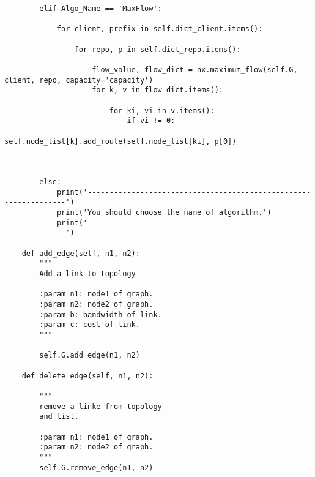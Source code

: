 \begin{lstlisting}
        elif Algo_Name == 'MaxFlow':

            for client, prefix in self.dict_client.items():

                for repo, p in self.dict_repo.items():

                    flow_value, flow_dict = nx.maximum_flow(self.G, client, repo, capacity='capacity')
                    for k, v in flow_dict.items():
                        
                        for ki, vi in v.items():
                            if vi != 0:
                                self.node_list[k].add_route(self.node_list[ki], p[0]) 



        else:
            print('-----------------------------------------------------------------')
            print('You should choose the name of algorithm.')
            print('-----------------------------------------------------------------')

    def add_edge(self, n1, n2):
        """
        Add a link to topology

        :param n1: node1 of graph.
        :param n2: node2 of graph.
        :param b: bandwidth of link.
        :param c: cost of link.
        """

        self.G.add_edge(n1, n2)

    def delete_edge(self, n1, n2):

        """
        remove a linke from topology
        and list.

        :param n1: node1 of graph.
        :param n2: node2 of graph.
        """
        self.G.remove_edge(n1, n2)



\end{lstlisting}
